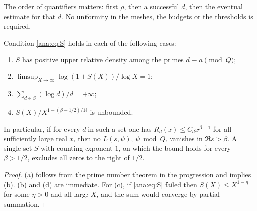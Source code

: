 The order of quantifiers matters: first $\rho$, then a successful $d$, then the eventual
estimate for that $d$. No uniformity in the meshes, the budgets or the thresholds is required.

\begin{corollary}\label{ana:cor:density}
Condition \eqref{ana:eq:S} holds in each of the following cases:
\begin{enumerate}[label=\textup{(\alph*)}]
\item $S$ has positive upper relative density among the primes $d\equiv a\pmod Q$;
\item $\limsup_{X\to\infty}\log(1+S(X))/\log X=1$;
\item $\sum_{d\in S}(\log d)/d=+\infty$;
\item $S(X)/X^{1-(\beta-1/2)/18}$ is unbounded.
\end{enumerate}
In particular, if for every $d$ in such a set one has $R_d(x)\le C_dx^{\beta-1}$ for all
sufficiently large real $x$, then no $L(s,\psi)$, $\psi\bmod Q$, vanishes in $\Re s>\beta$.
A single set $S$ with counting exponent $1$, on which the bound holds for every $\beta>1/2$,
excludes all zeros to the right of $1/2$.
\end{corollary}

\begin{proof}
(a) follows from the prime number theorem in the progression and implies (b). (b) and (d) are
immediate. For (c), if \eqref{ana:eq:S} failed then $S(X)\le X^{1-\eta}$ for some $\eta>0$ and
all large $X$, and the sum would converge by partial summation.
\end{proof}

